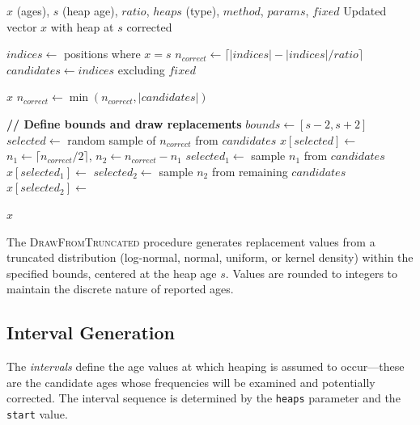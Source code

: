 \documentclass[12pt]{article}
\theoremstyle{plain}
\theoremstyle{definition}
\begin{document}
\begin{algorithm}
\small
\caption{Correct Single Heap}\label{alg:correctSingleHeap}
\begin{algorithmic}[1]
\Require $x$ (ages), $s$ (heap age), $ratio$, $heaps$ (type), $method$, $params$, $fixed$
\Ensure Updated vector $x$ with heap at $s$ corrected

\State $indices \gets$ positions where $x = s$
\State $n_{correct} \gets \lceil |indices| - |indices| / ratio \rceil$
\State $candidates \gets indices$ excluding $fixed$

 \Return $x$ \EndIf
\State $n_{correct} \gets \min(n_{correct}, |candidates|)$

\State \textbf{// Define bounds and draw replacements}
    \State $bounds \gets [s - 2, s + 2]$
    \State $selected \gets$ random sample of $n_{correct}$ from $candidates$
    \State $x[selected] \gets$ 
    \State $n_1 \gets \lceil n_{correct} / 2 \rceil$, \quad $n_2 \gets n_{correct} - n_1$
    \State $selected_1 \gets$ sample $n_1$ from $candidates$
    \State $x[selected_1] \gets$ 
    \State $selected_2 \gets$ sample $n_2$ from remaining $candidates$
    \State $x[selected_2] \gets$ 
\EndIf

\State \Return $x$
\end{algorithmic}
\end{algorithm}

\normalsize

The \textsc{DrawFromTruncated} procedure generates replacement values from a truncated distribution (log-normal, normal, uniform, or kernel density) within the specified bounds, centered at the heap age $s$. Values are rounded to integers to maintain the discrete nature of reported ages.


\subsection{Interval Generation}

The \emph{intervals} define the age values at which heaping is assumed to occur---these are the candidate ages whose frequencies will be examined and potentially corrected. The interval sequence is determined by the \texttt{heaps} parameter and the \texttt{start} value.
\end{document}
